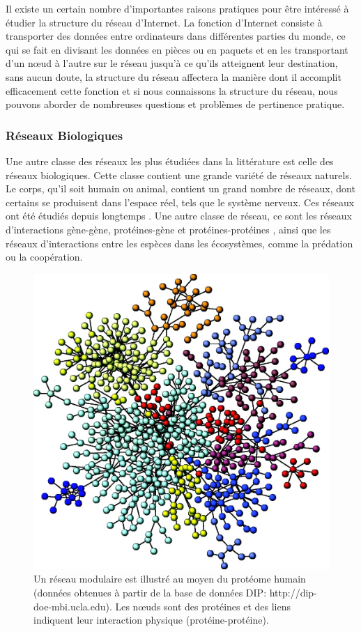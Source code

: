 Il existe un certain nombre d'importantes raisons pratiques pour être intéressé à étudier la structure du réseau
d'Internet. La fonction d'Internet consiste à transporter des données entre ordinateurs dans différentes parties du 
monde, ce qui se fait en divisant les données en pièces ou en paquets et en les transportant d'un nœud à l'autre sur
le réseau jusqu'à ce qu'ils atteignent leur destination, sans aucun doute, la structure du réseau affectera la manière
dont il accomplit efficacement cette fonction et si nous connaissons la structure du réseau, nous pouvons aborder de
nombreuses questions et problèmes de pertinence pratique.

\subsubsection{Réseaux Biologiques}
Une autre classe des  réseaux les plus étudiées dans la littérature est celle des réseaux biologiques. Cette classe
contient une grande variété de réseaux naturels. Le corps, qu'il soit humain ou animal, contient un grand nombre de 
réseaux, dont certains se produisent dans l'espace réel, tels que le système nerveux. Ces réseaux ont été étudiés 
depuis longtemps \cite{WB1997}. Une autre classe de réseau, ce sont les réseaux d'interactions gène-gène, 
protéines-gène et protéines-protéines \cite{DM2003}, ainsi que les réseaux d'interactions entre les espèces dans
les écosystèmes, comme la prédation ou la coopération.\\
\begin{figure}[h!]
	\centering
	\includegraphics[scale=0.2]{./figures/PPI}
	\caption{Un réseau modulaire est illustré au moyen du protéome humain (données obtenues à partir de la base
		de données DIP: http://dip-doe-mbi.ucla.edu). Les nœuds sont des protéines et des liens indiquent leur 
		interaction physique (protéine-protéine).}
	\label{PPI}
\end{figure}
